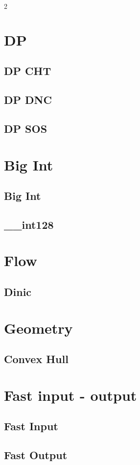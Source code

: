 \documentclass{hxie_template}
\begin{document}
\begin{multicols}{2}
\section{DP}
\subsection{DP CHT}

\subsection{DP DNC}

\subsection{DP SOS}

\section{Big Int}
\subsection{Big Int}

\subsection{\_\_int128}

\section{Flow}
\subsection{Dinic}

\section{Geometry}
\subsection{Convex Hull}

\section{Fast input - output}
\subsection{Fast Input}

\subsection{Fast Output}

\end{multicols}
\end{document}
